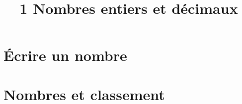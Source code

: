 \documentclass[12pt,a4paper]{article}
\date{}
\title{\textcircled{{\normalsize{1}}} Nombres entiers et décimaux}
\begin{document}
\maketitle





\vspace*{-0.5cm}

\section{\'Ecrire un nombre}\label{sec:ecrire-un-nombre}




%
%
%
%
\section{Nombres et classement}
%

\end{document}
